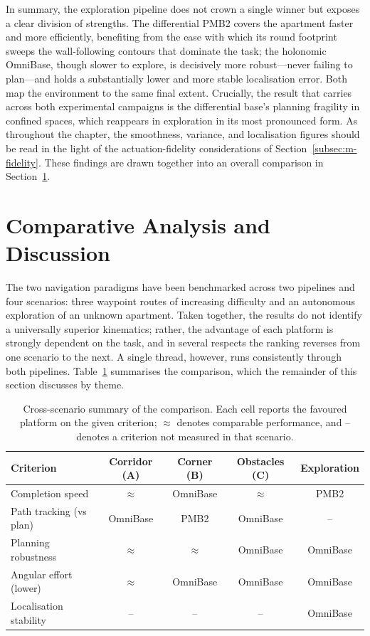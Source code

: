 In summary, the exploration pipeline does not crown a single winner but exposes a clear division of strengths. The differential PMB2 covers the apartment faster and more efficiently, benefiting from the ease with which its round footprint sweeps the wall-following contours that dominate the task; the holonomic OmniBase, though slower to explore, is decisively more robust---never failing to plan---and holds a substantially lower and more stable localisation error. Both map the environment to the same final extent. Crucially, the result that carries across both experimental campaigns is the differential base's planning fragility in confined spaces, which reappears in exploration in its most pronounced form. As throughout the chapter, the smoothness, variance, and localisation figures should be read in the light of the actuation-fidelity considerations of Section~\ref{subsec:m-fidelity}. These findings are drawn together into an overall comparison in Section~\ref{sec:comparative-discussion}.

\section{Comparative Analysis and Discussion}
\label{sec:comparative-discussion}

The two navigation paradigms have been benchmarked across two pipelines and four scenarios: three waypoint routes of increasing difficulty and an autonomous exploration of an unknown apartment. Taken together, the results do not identify a universally superior kinematics; rather, the advantage of each platform is strongly dependent on the task, and in several respects the ranking reverses from one scenario to the next. A single thread, however, runs consistently through both pipelines. Table~\ref{tab:summary} summarises the comparison, which the remainder of this section discusses by theme.

\begin{table}[htbp]
\centering
\caption{Cross-scenario summary of the comparison. Each cell reports the favoured platform on the given criterion; $\approx$ denotes comparable performance, and -- denotes a criterion not measured in that scenario.}
\label{tab:summary}
\vspace{0.3cm}
\begin{tabular}{lcccc}
\toprule
Criterion & Corridor (A) & Corner (B) & Obstacles (C) & Exploration \\
\midrule
Completion speed         & $\approx$ & OmniBase & $\approx$ & PMB2 \\
Path tracking (vs plan)  & OmniBase & PMB2 & OmniBase & -- \\
Planning robustness      & $\approx$ & $\approx$ & OmniBase & OmniBase \\
Angular effort (lower)   & $\approx$ & OmniBase & OmniBase & OmniBase \\
Localisation stability   & -- & -- & -- & OmniBase \\
\bottomrule
\end{tabular}
\end{table}


